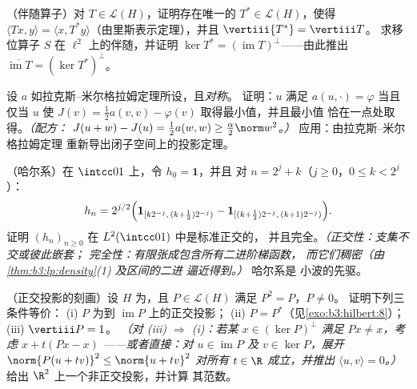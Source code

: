 \begin{exercise}[$\star\star$]\label{exo:b3:hilbert:8}
（伴随算子）对 $T \in \mathcal L(H)$，证明存在唯一的
$T^* \in \mathcal L(H)$，使得 $\langle Tx, y\rangle = \langle
x, T^*y\rangle$（由里斯表示定理），并且 $\vertiii{T^*} = \vertiii T$。
求移位算子 $S$ 在 $\ell^2$ 上的伴随，并证明
$\ker T^* = (\operatorname{im}T)^\perp$——由此推出
$\overline{\operatorname{im}T} = (\ker T^*)^\perp$。
\end{exercise}

\begin{exercise}[$\star\star$]\label{exo:b3:hilbert:9}
设 $a$ 如拉克斯–米尔格拉姆定理所设，且\emph{对称}。
证明：$u$ 满足 $a(u, \cdot) = \varphi$ 当且仅当 $u$ 使
$J(v) = \frac12a(v, v) - \varphi(v)$ 取得最小值，并且最小值
恰在一点处取得。\emph{（配方：
$J(u + w) - J(u) = \frac12a(w,w) \geq
\frac\alpha2\norm w^2$。）} 应用：由拉克斯–米尔格拉姆定理
重新导出闭子空间上的投影定理。
\end{exercise}

\begin{exercise}[$\star\star\star$]\label{exo:b3:hilbert:10}
（哈尔系）在 $\intcc01$ 上，令 $h_{0} = \mathbf 1$，并且
对 $n = 2^j + k$（$j \geq 0$，$0 \leq k < 2^j$）：
\[
h_n = 2^{j/2}\Bigl(\mathbf 1_{[k2^{-j},\,(k +
\frac12)2^{-j})} - \mathbf 1_{[(k+\frac12)2^{-j},\,(k+1)2^{-j})}
\Bigr).
\]
证明 $(h_n)_{n\geq0}$ 在 $L^2(\intcc01)$ 中是标准正交的，
并且完全。\emph{（正交性：支集不交或彼此嵌套；
完全性：有限张成包含所有二进阶梯函数，
而它们稠密（由 \cref{thm:b3:lp:density}(1) 及区间的二进
逼近得到。）} 哈尔系是
小波的先驱。
\end{exercise}

\begin{exercise}[$\star\star$]\label{exo:b3:hilbert:11}
（正交投影的刻画）设 $H$ 为，且 $P \in \mathcal L(H)$ 满足 $P^2 = P$，$P \neq 0$。
证明下列三条件等价：
(i) $P$ 为到
$\operatorname{im}P$ 上的正交投影；
(ii) $P = P^*$（见\cref{exo:b3:hilbert:8}）；
(iii) $\vertiii P = 1$。
\emph{（对 (iii) $\Rightarrow$ (i)：若某 $x \in
(\ker P)^\perp$ 满足 $Px \neq x$，考虑 $x + t(Px - x)$
——或者直接：对 $u \in \operatorname{im}P$ 及 $v \in
\ker P$，展开 $\norm{P(u + tv)}^2 \leq \norm{u + tv}^2$
对所有 $t \in \R$ 成立，并推出 $\langle u, v\rangle = 0$。）}
给出 $\R^2$ 上一个非正交投影，并计算
其范数。
\end{exercise}

